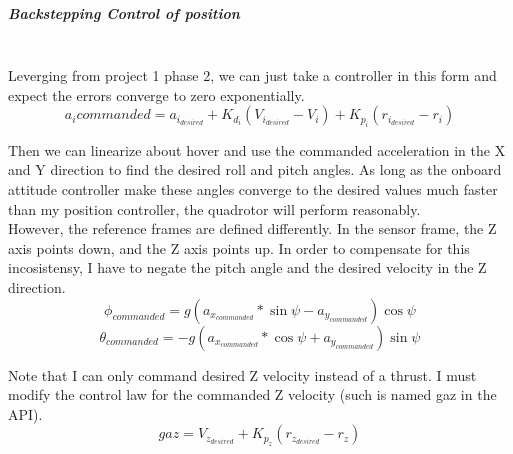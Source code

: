 \documentclass{article}
\begin{document}
\subparagraph{Backstepping Control of position}\\

Leverging from project 1 phase 2, we can just take a controller in this form and expect the errors converge to zero exponentially.
\[a_i{commanded} = a_i_{desired} + K_d_i(V_i_{desired} - V_i) + K_p_i(r_i_{desired} - r_i)\]

Then we can linearize about hover and use the commanded acceleration in the X and Y direction to find the desired roll and pitch angles. As long as the onboard attitude controller make these angles converge to the desired values much faster than my position controller, the quadrotor will perform reasonably.\\

However, the reference frames are defined differently. In the sensor frame, the Z axis points down, and the Z axis points up. In order to compensate for this incosistensy, I have to negate the pitch angle and the desired velocity in the Z direction.
\[\phi_{commanded} = g(a_x_{commanded}*\sin\psi - a_y_{commanded})\cos\psi\]
\[\theta_{commanded} = -g(a_x_{commanded}*\cos\psi + a_y_{commanded})\sin\psi\]

Note that I can only command desired Z velocity instead of a thrust. I must modify the control law for the commanded Z velocity (such is named gaz in the API).
\[gaz = V_z_{desired} + K_p_z(r_z_{desired} - r_z)\]
\end{document}
